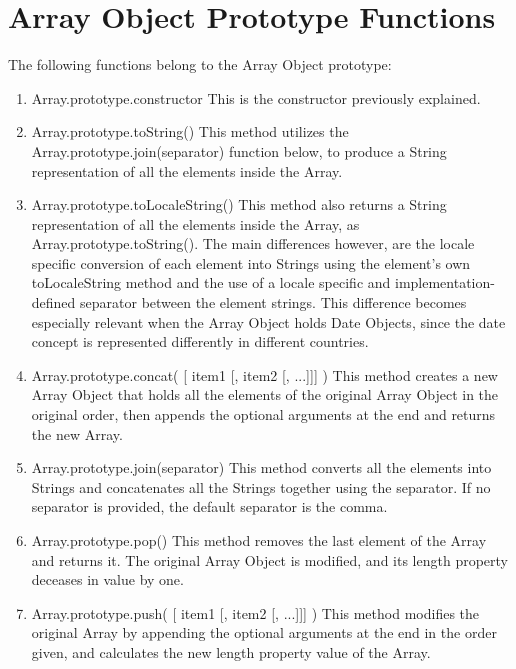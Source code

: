 \documentclass[a4paper,11pt,twoside]{report}
\begin{document}
\section{Array Object Prototype Functions}
The following functions belong to the Array Object prototype: 
\begin{enumerate}
\item Array.prototype.constructor \newline
This is the constructor previously explained.

\item Array.prototype.toString() \newline
This method utilizes the Array.prototype.join(separator) function below, to produce a String representation of all the elements inside the Array.

\item Array.prototype.toLocaleString() \newline
This method also returns a String representation of all the elements inside the Array, as Array.prototype.toString(). The main differences however, are the locale specific conversion of each element into Strings using the element's own toLocaleString method and the use of a locale specific and implementation-defined separator between the element strings. This difference becomes especially relevant when the Array Object holds Date Objects, since the date concept is represented differently in different countries.

\item Array.prototype.concat( [ item1 [, item2 [, ...]]] ) \newline
This method creates a new Array Object that holds all the elements of the original Array Object in the original order, then appends the optional arguments at the end and returns the new Array.

\item Array.prototype.join(separator) \newline
This method converts all the elements into Strings and concatenates all the Strings together using the separator. If no separator is provided, the default separator is the comma.

\item Array.prototype.pop() \newline
This method removes the last element of the Array and returns it. The original Array Object is modified, and its length property deceases in value by one.

\item Array.prototype.push( [ item1 [, item2 [, ...]]] ) \newline
This method modifies the original Array by appending the optional arguments at the end in the order given, and calculates the new length property value of the Array.


\end{enumerate}
\end{document}
